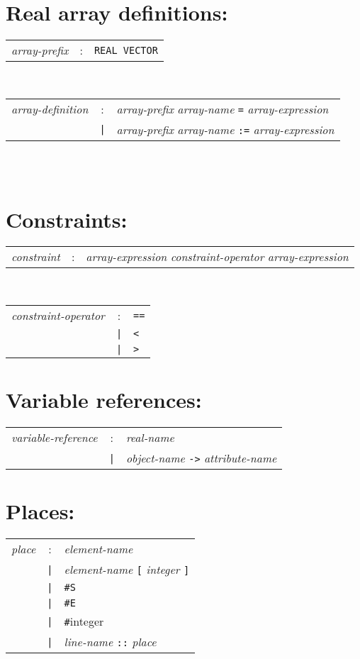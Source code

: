 \section*{Real array definitions:}
\begin{tabular}{p{4cm}cl}
\textit{array-prefix}
  &:& \texttt{REAL VECTOR}
\end{tabular}
\\
\begin{tabular}{p{4cm}cl}
\textit{array-definition}
  &:& \textit{array-prefix} \textit{array-name} \texttt{=}
    \textit{array-expression} \\
  &\texttt{|}& \textit{array-prefix} \textit{array-name} \texttt{:=}
    \textit{array-expression}
\end{tabular}
\\
\begin{tabular}{p{4cm}cl}
\end{tabular}

\section*{Constraints:}
\begin{tabular}{p{4cm}cl}
\textit{constraint}
  &:& \textit{array-expression} \textit{constraint-operator}
    \textit{array-expression}
\end{tabular}
\\
\begin{tabular}{p{4cm}cl}
\textit{constraint-operator}
  &:& \texttt{==} \\
  &\texttt{|}& \texttt{<} \\
  &\texttt{|}& \texttt{>}
\end{tabular}

\section*{Variable references:}
\begin{tabular}{p{4cm}cl}
\textit{variable-reference}
  &:& \textit{real-name} \\
  &\texttt{|}& \textit{object-name} \texttt{->} \textit{attribute-name}
\end{tabular}

\section*{Places:}
\begin{tabular}{p{4cm}cl}
\textit{place}
  &:& \textit{element-name} \\
  &\texttt{|}& \textit{element-name} \texttt{[} \textit{integer} \texttt{]} \\
  &\texttt{|}& \texttt{\#S} \\
  &\texttt{|}& \texttt{\#E} \\
  &\texttt{|}& \texttt{\#}{integer} \\
  &\texttt{|}& \textit{line-name} \texttt{::} \textit{place}
\end{tabular}

